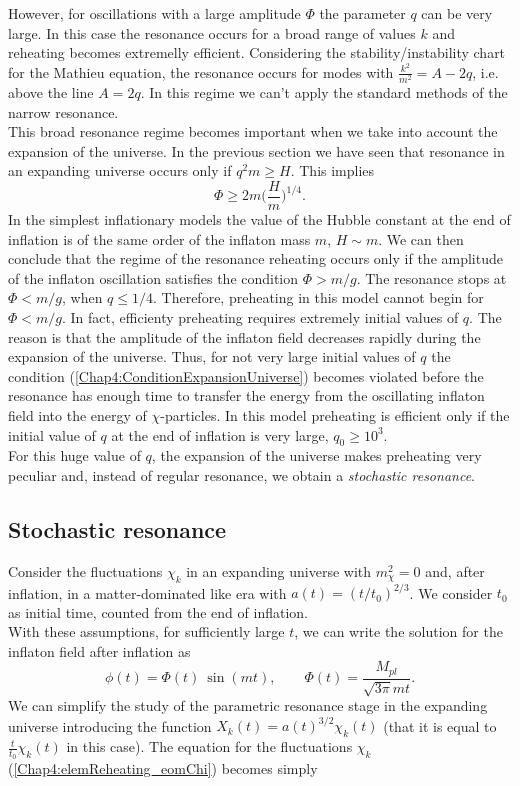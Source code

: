 \documentclass[11pt,a4paper,twoside]{book}
\begin{document}
However, for oscillations with a large amplitude $\Phi$ the parameter $ q $ can be very large. In this case the resonance occurs for a broad range of values $ k $ and reheating becomes extremelly efficient. Considering the stability/instability chart for the Mathieu equation, the resonance occurs for modes  with $ \frac{k^{2}}{m^{2}}=A-2q $, i.e. above the line $ A=2q $. In this regime we can't apply the standard methods of the narrow resonance.\\
This broad resonance regime becomes important when we take into account the expansion of the universe. In the previous section we have seen that resonance in an expanding universe occurs only if $ q^{2}m \ge H $. This implies
\begin{equation}
	\label{Chap4:ConditionExpansionUniverse}
	\Phi \ge 2m\Bigg(\frac{H}{m}\Bigg)^{1/4}.
\end{equation}
In the simplest inflationary models the value of the Hubble constant at the end of inflation is of the same order of the inflaton mass $ m $, $ H \sim m $. We can then conclude that the regime of the resonance reheating occurs only if the amplitude of the inflaton oscillation satisfies the condition $ \Phi > m/g $. The resonance stops at $ \Phi < m/g $, when $ q \le 1/4 $. Therefore, preheating in this model cannot begin for $ \Phi < m/g $. In fact, efficienty preheating requires extremely initial values of $ q $. The reason is that the amplitude of the inflaton field decreases rapidly during the expansion of the universe. Thus, for not very large initial values of $ q $ the condition (\ref{Chap4:ConditionExpansionUniverse}) becomes violated before the resonance has enough time to transfer the energy from the oscillating inflaton field into the energy of $ \chi $-particles. In this model preheating is efficient only if the initial value of $ q $ at the end of inflation is very large, $ q_{0} \ge 10^{3} $.\\
For this huge value of $ q $, the expansion of the universe makes preheating very peculiar and, instead of regular resonance, we obtain a  \textit{stochastic resonance}.
\subsection{Stochastic resonance}
Consider the fluctuations $\chi_{k}$ in an expanding universe with $ m^{2}_{\chi}=0 $ and, after inflation, in a matter-dominated like era with $ a(t)=(t/t_{0})^{2/3} $. We consider $ t_{0} $ as initial time, counted from the end of inflation. \\
With these assumptions, for sufficiently large $ t $, we can write the solution for the inflaton field after inflation as 
\begin{equation}
\label{Chap4:solutionInflaton}
\phi(t)=\Phi(t)\ \sin(mt),
\qquad
\Phi(t) = \frac{M_{pl}}{\sqrt{3\pi}mt}.
\end{equation}
We can simplify the study of the parametric resonance stage in the expanding universe introducing the function $ X_{k}(t)=a(t)^{3/2}\chi_{k}(t) $ (that it is equal to $ \frac{t}{t_{0}}\chi_{k}(t) $ in this case). The equation for the fluctuations $ \chi_{k} $ (\ref{Chap4:elemReheating_eomChi}) becomes simply
\end{document}
